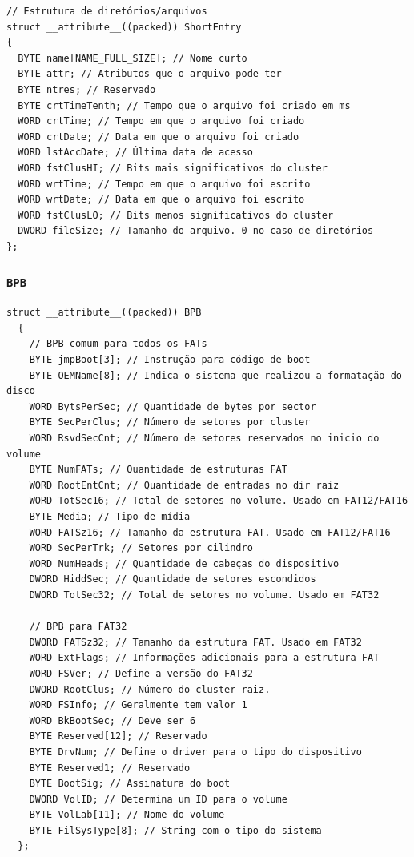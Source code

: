 \documentclass[
    12pt,				%
    oneside,   	        %
    a4paper,			%
    english,			%
    french,				%
    spanish,			%
    brazil,				%
    ]{pacotes/abntex2}
\begin{document}
\begin{lstlisting}[caption={Estrutura que representa uma entrada curta no sistema de arquivos}, label={lst:shortentry}] 
// Estrutura de diretórios/arquivos
struct __attribute__((packed)) ShortEntry
{
  BYTE name[NAME_FULL_SIZE]; // Nome curto 
  BYTE attr; // Atributos que o arquivo pode ter
  BYTE ntres; // Reservado
  BYTE crtTimeTenth; // Tempo que o arquivo foi criado em ms
  WORD crtTime; // Tempo em que o arquivo foi criado
  WORD crtDate; // Data em que o arquivo foi criado
  WORD lstAccDate; // Última data de acesso
  WORD fstClusHI; // Bits mais significativos do cluster
  WORD wrtTime; // Tempo em que o arquivo foi escrito
  WORD wrtDate; // Data em que o arquivo foi escrito
  WORD fstClusLO; // Bits menos significativos do cluster
  DWORD fileSize; // Tamanho do arquivo. 0 no caso de diretórios
};
\end{lstlisting}

\subsubsection{\texttt{BPB}}
\label{subsubsec:bpb}

\begin{lstlisting}[caption={Estrutura que representa o BPB encontrado no volume FAT}, label={lst:bpb}]
  struct __attribute__((packed)) BPB
  {
    // BPB comum para todos os FATs
    BYTE jmpBoot[3]; // Instrução para código de boot
    BYTE OEMName[8]; // Indica o sistema que realizou a formatação do disco
    WORD BytsPerSec; // Quantidade de bytes por sector
    BYTE SecPerClus; // Número de setores por cluster
    WORD RsvdSecCnt; // Número de setores reservados no inicio do volume
    BYTE NumFATs; // Quantidade de estruturas FAT
    WORD RootEntCnt; // Quantidade de entradas no dir raiz
    WORD TotSec16; // Total de setores no volume. Usado em FAT12/FAT16
    BYTE Media; // Tipo de mídia
    WORD FATSz16; // Tamanho da estrutura FAT. Usado em FAT12/FAT16
    WORD SecPerTrk; // Setores por cilindro
    WORD NumHeads; // Quantidade de cabeças do dispositivo
    DWORD HiddSec; // Quantidade de setores escondidos
    DWORD TotSec32; // Total de setores no volume. Usado em FAT32

    // BPB para FAT32
    DWORD FATSz32; // Tamanho da estrutura FAT. Usado em FAT32
    WORD ExtFlags; // Informações adicionais para a estrutura FAT
    WORD FSVer; // Define a versão do FAT32
    DWORD RootClus; // Número do cluster raiz.
    WORD FSInfo; // Geralmente tem valor 1
    WORD BkBootSec; // Deve ser 6
    BYTE Reserved[12]; // Reservado
    BYTE DrvNum; // Define o driver para o tipo do dispositivo
    BYTE Reserved1; // Reservado
    BYTE BootSig; // Assinatura do boot
    DWORD VolID; // Determina um ID para o volume
    BYTE VolLab[11]; // Nome do volume
    BYTE FilSysType[8]; // String com o tipo do sistema
  };
\end{lstlisting}
\end{document}
